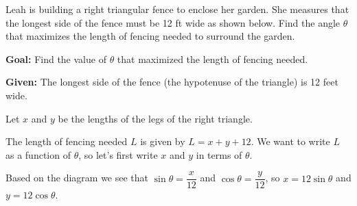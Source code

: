 \documentclass{article}
\begin{document}
\begin{enumerate}
\begin{problem}
Leah is building a right triangular fence to enclose her garden. She measures that the longest side of the fence must be 12 ft wide as shown below. Find the angle $\theta$ that maximizes the length of fencing needed to surround the garden. 
\end{problem}


\begin{solution}
    \textbf{Goal:} Find the value of $\theta$ that maximized the length of fencing needed.

    \textbf{Given:} The longest side of the fence (the hypotenuse of the triangle) is 12 feet wide.

    Let $x$ and $y$ be the lengths of the legs of the right triangle.


    The length of fencing needed $L$ is given by $L=x+y+12$. We want to write $L$ as a function of $\theta$, so let's first write $x$ and $y$ in terms of $\theta$. 

    Based on the diagram we see that $\sin \theta =\dfrac{x}{12}$ and $\cos \theta = \dfrac{y}{12}$, so $x=12\sin \theta$ and $y=12\cos\theta$. 


\end{solution}
\end{enumerate}
\end{document}
